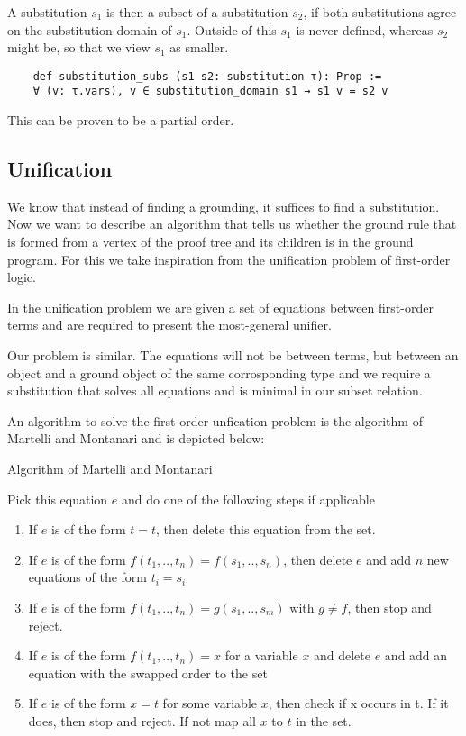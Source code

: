     A substitution $s_1$ is then a subset of a substitution $s_2$, if both substitutions agree on the substitution domain of $s_1$. Outside of this $s_1$ is never defined, whereas $s_2$ might be, so that we view $s_1$ as smaller.

    \begin{lstlisting}
    def substitution_subs (s1 s2: substitution τ): Prop :=
    ∀ (v: τ.vars), v ∈ substitution_domain s1 → s1 v = s2 v
    \end{lstlisting}

    This can be proven to be a partial order.

\subsection{Unification}

We know that instead of finding a grounding, it suffices to find a substitution. Now we want to describe an algorithm that tells us whether the ground rule that is formed from a vertex of the proof tree and its children is in the ground program. For this we take inspiration from the unification problem of first-order logic.

In the unification problem we are given a set of equations between first-order terms and are required to present the most-general unifier.

Our problem is similar. The equations will not be between terms, but between an object and a ground object of the same corrosponding type and we require a substitution that solves all equations and is minimal in our subset relation.

An algorithm to solve the first-order unfication problem is the algorithm of Martelli and Montanari \cite{MartMont} and is depicted below:
\begin{algorithm}
    \caption{Algorithm of Martelli and Montanari}
\begin{algorithmic}
    \State Pick this equation $e$ and do one of the following steps if applicable
    \begin{enumerate}
        \item If $e$ is of the form $t = t$, then delete this equation from the set.
        \item If $e$ is of the form $f(t_1, .., t_n) = f(s_1,.., s_n)$, then delete $e$ and add $n$ new equations of the form $t_i = s_i$
        \item If $e$ is of the form $f(t_1, .., t_n) = g(s_1,.., s_m)$ with $g \neq f$, then stop and reject.
        \item If $e$ is of the form $f(t_1,..,t_n) = x$ for a variable $x$ and delete $e$ and add an equation with the swapped order to the set
        \item If $e$ is of the form $x=t$ for some variable $x$, then check if x occurs in t. If it does, then stop and reject. If not map all $x$ to $t$ in the set.
    \end{enumerate}
    \EndWhile
\end{algorithmic}
\end{algorithm}

